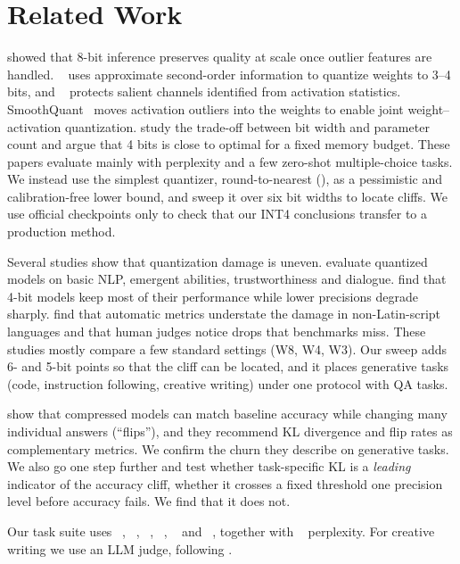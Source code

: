 \section{Related Work}
\label{sec:related}

\citet{dettmers2022llmint8} showed that 8-bit inference preserves quality at scale once outlier features are handled. \gptq~\cite{frantar2023gptq} uses approximate second-order information to quantize weights to 3--4 bits, and \awq~\cite{lin2024awq} protects salient channels identified from activation statistics. SmoothQuant~\cite{xiao2023smoothquant} moves activation outliers into the weights to enable joint weight--activation quantization. \citet{dettmers2023case} study the trade-off between bit width and parameter count and argue that 4 bits is close to optimal for a fixed memory budget. These papers evaluate mainly with perplexity and a few zero-shot multiple-choice tasks. We instead use the simplest quantizer, round-to-nearest (\rtn), as a pessimistic and calibration-free lower bound, and sweep it over six bit widths to locate cliffs. We use official \awq checkpoints only to check that our INT4 conclusions transfer to a production method.

Several studies show that quantization damage is uneven. \citet{li2024evaluating} evaluate quantized models on basic NLP, emergent abilities, trustworthiness and dialogue. \citet{jin2024comprehensive} find that 4-bit models keep most of their performance while lower precisions degrade sharply. \citet{marchisio2024quantization} find that automatic metrics understate the damage in non-Latin-script languages and that human judges notice drops that benchmarks miss. These studies mostly compare a few standard settings (\eg W8, W4, W3). Our sweep adds 6- and 5-bit points so that the cliff can be located, and it places generative tasks (code, instruction following, creative writing) under one protocol with QA tasks.

\citet{dutta2024accuracy} show that compressed models can match baseline accuracy while changing many individual answers (``flips''), and they recommend KL divergence and flip rates as complementary metrics. We confirm the churn they describe on generative tasks. We also go one step further and test whether task-specific KL is a \emph{leading} indicator of the accuracy cliff, \ie whether it crosses a fixed threshold one precision level before accuracy fails. We find that it does not.

Our task suite uses \gsm~\cite{cobbe2021gsm8k}, \trivia~\cite{joshi2017triviaqa}, \squad~\cite{rajpurkar2016squad}, \humaneval~\cite{chen2021humaneval}, \ifeval~\cite{zhou2023ifeval} and \wprompts~\cite{fan2018hierarchical}, together with \wikitext~\cite{merity2016pointer} perplexity. For creative writing we use an LLM judge, following \citet{zheng2023judging}.
